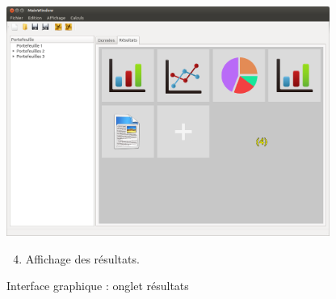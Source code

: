 	\begin{figure}[ht]
		\center
		\includegraphics[width=400px]{logicielResultat.png}
		\caption{Interface graphique : onglet résultats}
		\label{interface2}
		\begin{enumerate}
			\setcounter{enumi}{3} 
			\item Affichage des résultats.
		\end{enumerate}
	\end{figure}
